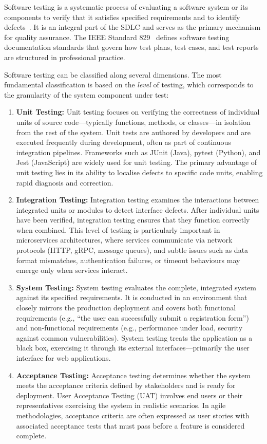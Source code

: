Software testing is a systematic process of evaluating a software system or its components to verify that it satisfies specified requirements and to identify defects~\cite{istqb2023}. It is an integral part of the SDLC and serves as the primary mechanism for quality assurance. The IEEE Standard 829~\cite{ieee829} defines software testing documentation standards that govern how test plans, test cases, and test reports are structured in professional practice.

Software testing can be classified along several dimensions. The most fundamental classification is based on the \emph{level} of testing, which corresponds to the granularity of the system component under test:

\begin{enumerate}
    \item \textbf{Unit Testing:} Unit testing focuses on verifying the correctness of individual units of source code---typically functions, methods, or classes---in isolation from the rest of the system. Unit tests are authored by developers and are executed frequently during development, often as part of continuous integration pipelines. Frameworks such as JUnit (Java), pytest (Python), and Jest (JavaScript) are widely used for unit testing. The primary advantage of unit testing lies in its ability to localise defects to specific code units, enabling rapid diagnosis and correction.

    \item \textbf{Integration Testing:} Integration testing examines the interactions between integrated units or modules to detect interface defects. After individual units have been verified, integration testing ensures that they function correctly when combined. This level of testing is particularly important in microservices architectures, where services communicate via network protocols (HTTP, gRPC, message queues), and subtle issues such as data format mismatches, authentication failures, or timeout behaviours may emerge only when services interact.

    \item \textbf{System Testing:} System testing evaluates the complete, integrated system against its specified requirements. It is conducted in an environment that closely mirrors the production deployment and covers both functional requirements (e.g., ``the user can successfully submit a registration form'') and non-functional requirements (e.g., performance under load, security against common vulnerabilities). System testing treats the application as a black box, exercising it through its external interfaces---primarily the user interface for web applications.

    \item \textbf{Acceptance Testing:} Acceptance testing determines whether the system meets the acceptance criteria defined by stakeholders and is ready for deployment. User Acceptance Testing (UAT) involves end users or their representatives exercising the system in realistic scenarios. In agile methodologies, acceptance criteria are often expressed as user stories with associated acceptance tests that must pass before a feature is considered complete.
\end{enumerate}

